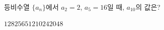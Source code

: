 등비수열 $\{a_n\}$에서 $a_2=2$, $a_5=16$일 때, $a_{10}$의 값은?
\begin{choices32}{$128$}{$256$}{$512$}{$1024$}{$2048$}\end{choices32}
